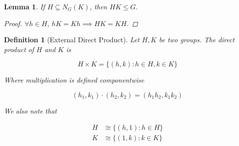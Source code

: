 \documentclass{article}
\newtheorem{lemma}{Lemma}
\newtheorem{mdef}{Definition}
\begin{document}
\begin{lemma}
  If $H \subseteq N_G(K)$, then $HK \leq G$.

  \begin{proof}
    $\forall h \in H$, $hK = Kh \implies HK = KH$.
  \end{proof}
\end{lemma}

\begin{mdef}[External Direct Product]
  Let $H, K$ be two groups. The direct product of $H$ and $K$ is

  \[H \times K = \{(h, k) : h \in H, k \in K\}\]

  Where multiplication is defined componentwise

  \[(h_1, k_1) \cdot (h_2, k_2) = (h_1 h_2, k_1 k_2)\]

  We also note that

  \begin{align*}
    H &\cong \{(h, 1) : h \in H\}\\
    K &\cong \{(1, k) : k \in K\}\\
  \end{align*}
\end{mdef}
\end{document}
